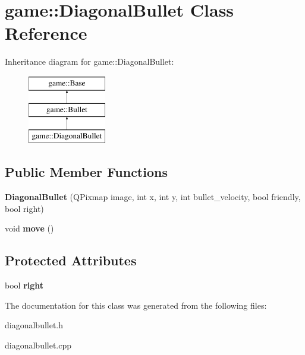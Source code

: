 \hypertarget{classgame_1_1DiagonalBullet}{}\section{game\+:\+:Diagonal\+Bullet Class Reference}
\label{classgame_1_1DiagonalBullet}
Inheritance diagram for game\+:\+:Diagonal\+Bullet\+:\begin{figure}[H]
\begin{center}
\leavevmode
\includegraphics[height=3.000000cm]{classgame_1_1DiagonalBullet}
\end{center}
\end{figure}
\subsection*{Public Member Functions}
\begin{DoxyCompactItemize}
\item 
\mbox{\label{classgame_1_1DiagonalBullet_a97dd705719599d66fe9b38651a3ff24c}} 
{\bfseries Diagonal\+Bullet} (Q\+Pixmap image, int x, int y, int bullet\+\_\+velocity, bool friendly, bool right)
\item 
\mbox{\label{classgame_1_1DiagonalBullet_aac9487bd1264212412d3217eba26287b}} 
void {\bfseries move} ()
\end{DoxyCompactItemize}
\subsection*{Protected Attributes}
\begin{DoxyCompactItemize}
\item 
\mbox{\label{classgame_1_1DiagonalBullet_a72f27d077361cad14c242b74bbacb5a5}} 
bool {\bfseries right}
\end{DoxyCompactItemize}


The documentation for this class was generated from the following files\+:\begin{DoxyCompactItemize}
\item 
diagonalbullet.\+h\item 
diagonalbullet.\+cpp\end{DoxyCompactItemize}
